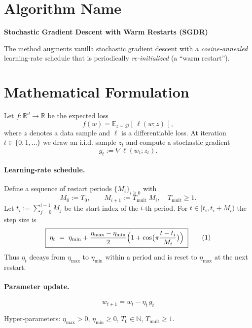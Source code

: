 \documentclass{article}
\newcommand{\E}{\mathbb{E}}
\newcommand{\R}{\mathbb{R}}
\begin{document}
\section*{Algorithm Name}
\textbf{Stochastic Gradient Descent with Warm Restarts (SGDR)}  

The method augments vanilla stochastic gradient descent with a \emph{cosine‑annealed} learning‑rate schedule that is periodically \emph{re‑initialized} (a “warm restart”).  

\section*{Mathematical Formulation}
Let $f:\R^d\rightarrow\R$ be the expected loss
\[
f(w)=\E_{z\sim\mathcal D}[\,\ell(w;z)\,],
\]
where $z$ denotes a data sample and $\ell$ is a differentiable loss.  
At iteration $t\in\{0,1,\dots\}$ we draw an i.i.d. sample $z_t$ and compute a stochastic gradient
\[
g_t:=\nabla \ell(w_t;z_t).
\]

\paragraph{Learning‑rate schedule.}
Define a sequence of restart periods $\{M_i\}_{i\ge 0}$ with
\[
M_0:=T_0,\qquad M_{i+1}:=T_{\text{mult}}\;M_i,\quad T_{\text{mult}}\ge 1.
\]
Let $t_i:=\sum_{j=0}^{i-1}M_j$ be the start index of the $i$‑th period.  
For $t\in[t_i,t_i+M_i)$ the step size is
\[
\boxed{\;
\eta_t \;=\; \eta_{\min}+\frac{\eta_{\max}-\eta_{\min}}{2}
\Bigl(1+\cos\bigl(\pi\frac{t-t_i}{M_i}\bigr)\Bigr)
\;}
\tag{1}
\]
Thus $\eta_t$ decays from $\eta_{\max}$ to $\eta_{\min}$ within a period and is reset to $\eta_{\max}$ at the next restart.

\paragraph{Parameter update.}
\[
\boxed{\; w_{t+1}= w_t - \eta_t\, g_t \;}
\tag{2}
\]

Hyper‑parameters: $\eta_{\max}>0$, $\eta_{\min}\ge0$, $T_0\in\mathbb N$, $T_{\text{mult}}\ge1$.
\end{document}
